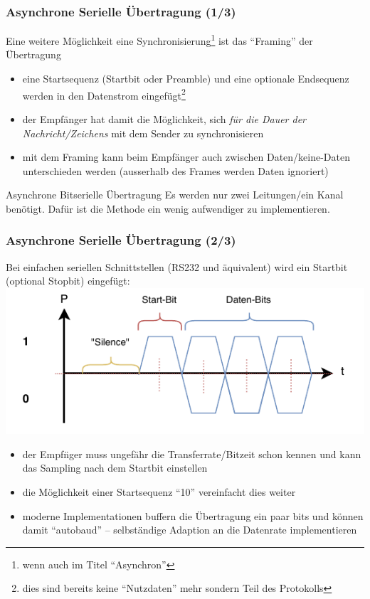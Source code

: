 \documentclass[ignorenonframetext]{beamer}
\begin{document}
\begin{frame}
\frametitle{Asynchrone Serielle \"Ubertragung (1/3)}
Eine weitere M\"oglichkeit eine Synchronisierung\footnote{wenn auch im Titel ``Asynchron''} ist das ``Framing'' der \"Ubertragung

\begin{itemize}
\item eine Startsequenz (Startbit oder Preamble) und eine optionale Endsequenz werden in den Datenstrom eingef\"ugt\footnote{dies sind bereits keine ``Nutzdaten'' mehr sondern Teil des Protokolls}
\item der Empf\"anger hat damit die M\"oglichkeit, sich \emph{f\"ur die Dauer der Nachricht/Zeichens} mit dem Sender zu synchronisieren
\item mit dem Framing kann beim Empf\"anger auch zwischen Daten/keine-Daten unterschieden werden (ausserhalb des Frames werden Daten ignoriert)
\end{itemize}
\begin{block}{Asynchrone Bitserielle \"Ubertragung}
Es werden nur zwei Leitungen/ein Kanal ben\"otigt. Daf\"ur ist die Methode ein wenig aufwendiger zu implementieren.
\end{block}
\end{frame}



\begin{frame}
\frametitle{Asynchrone Serielle \"Ubertragung (2/3)}
Bei einfachen seriellen Schnittstellen (RS232 und \"aquivalent) wird ein Startbit (optional Stopbit) eingef\"ugt:
\includegraphics{asynchron-startbit}
\begin{itemize}
\item der Empf\"nger muss ungef\"ahr die Transferrate/Bitzeit schon kennen und kann das Sampling nach dem Startbit einstellen
\item die M\"oglichkeit einer Startsequenz ``10'' vereinfacht dies weiter
\item moderne Implementationen buffern die \"Ubertragung ein paar bits und k\"onnen damit ``autobaud'' -- selbst\"andige Adaption an die Datenrate implementieren
\end{itemize}
\end{frame}
\end{document}
